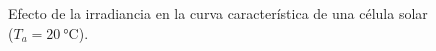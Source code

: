 %
\begin{figure}
\begin{centering}
\par\end{centering}

\begin{centering}
\end{centering}

\caption{Efecto de la irradiancia en la curva característica de una célula
solar ($T_a=\SI{20}{\celsius}$).\label{fig:EfectoIrradianciaUNED}}

\end{figure}



